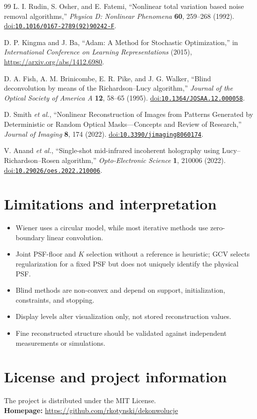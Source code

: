 \documentclass[10pt,a4paper]{article}
\newcommand{\doilink}[1]{\href{https://doi.org/#1}{doi:\nolinkurl{#1}}}
\begin{document}
\begin{thebibliography}{99}
L. I. Rudin, S. Osher, and E. Fatemi, ``Nonlinear total variation based noise removal algorithms,'' \emph{Physica D: Nonlinear Phenomena} \textbf{60}, 259--268 (1992). \doilink{10.1016/0167-2789(92)90242-F}.

D. P. Kingma and J. Ba, ``Adam: A Method for Stochastic Optimization,'' in \emph{International Conference on Learning Representations} (2015), \url{https://arxiv.org/abs/1412.6980}.

D. A. Fish, A. M. Brinicombe, E. R. Pike, and J. G. Walker, ``Blind deconvolution by means of the Richardson--Lucy algorithm,'' \emph{Journal of the Optical Society of America A} \textbf{12}, 58--65 (1995). \doilink{10.1364/JOSAA.12.000058}.

D. Smith \emph{et al.}, ``Nonlinear Reconstruction of Images from Patterns Generated by Deterministic or Random Optical Masks---Concepts and Review of Research,'' \emph{Journal of Imaging} \textbf{8}, 174 (2022). \doilink{10.3390/jimaging8060174}.

V. Anand \emph{et al.}, ``Single-shot mid-infrared incoherent holography using Lucy--Richardson--Rosen algorithm,'' \emph{Opto-Electronic Science} \textbf{1}, 210006 (2022). \doilink{10.29026/oes.2022.210006}.
\end{thebibliography}

\section{Limitations and interpretation}
\begin{itemize}
\item Wiener uses a circular model, while most iterative methods use zero-boundary linear convolution.
\item Joint PSF-floor and $K$ selection without a reference is heuristic; GCV selects regularization for a fixed PSF but does not uniquely identify the physical PSF.
\item Blind methods are non-convex and depend on support, initialization, constraints, and stopping.
\item Display levels alter visualization only, not stored reconstruction values.
\item Fine reconstructed structure should be validated against independent measurements or simulations.
\end{itemize}

\section{License and project information}
The project is distributed under the MIT License.\\
\textbf{Homepage:} \url{https://github.com/rkotynski/dekonwolucje}
\end{document}
